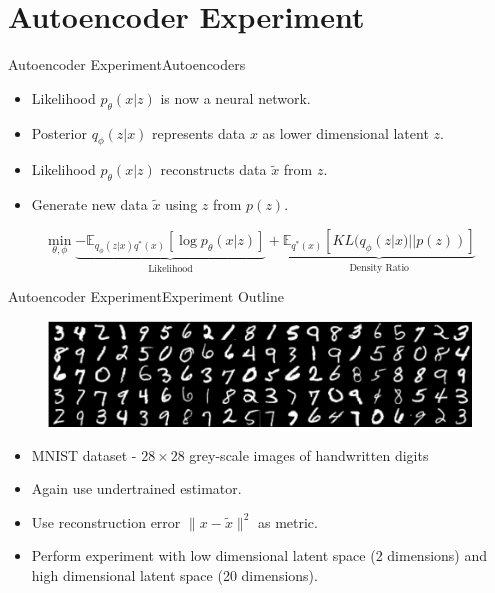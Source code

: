 \documentclass[handout]{beamer}
\begin{document}
\section{Autoencoder Experiment}
\begin{frame}{Autoencoder Experiment}{Autoencoders}
\begin{itemize}
\item Likelihood $p_\theta(x|z)$ is now a neural network.
\item Posterior $q_\phi(z|x)$ represents data $x$ as lower dimensional latent $z$.
\item Likelihood $p_\theta(x|z)$ reconstructs data $\tilde{x}$ from $z$.
\item Generate new data $\tilde{x}$ using $z$ from $p(z)$.
\end{itemize}
\begin{figure}[h]
  \centering
\end{figure}
\[\min_{\theta, \phi} \underbrace{-\mathbb{E}_{q_\phi(z|x)q^*(x)}[\log p_\theta(x|z)]}_{\text{Likelihood}}+\underbrace{\mathbb{E}_{q^*(x)}[KL(q_\phi(z|x)||p(z))]}_{\text{Density Ratio}}\]
\end{frame}
\begin{frame}{Autoencoder Experiment}{Experiment Outline}
\begin{figure}
\includegraphics[width=\linewidth]{mnist-digits-small.png}
\end{figure}
\begin{itemize}
\item MNIST dataset - $28\times 28$ grey-scale images of handwritten digits
\vspace{0.3cm}
\item Again use undertrained estimator.
\vspace{0.3cm}
\item Use reconstruction error $\|x-\tilde{x}\|^2$ as metric.
\vspace{0.3cm}
\item Perform experiment with low dimensional latent space (2 dimensions) and high dimensional latent space (20 dimensions).
\end{itemize}
\end{frame}
\end{document}
